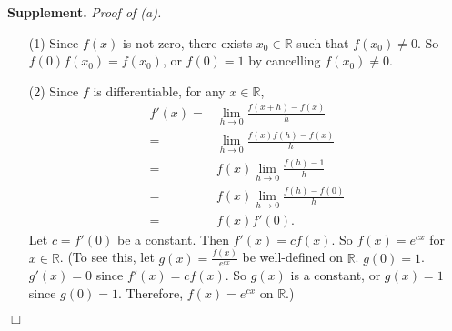 \documentclass{article}
\begin{document}
\textbf{Supplement.}
\emph{Proof of (a).}

\begin{enumerate}
\item[(1)]
Since $f(x)$ is not zero, there exists $x_0 \in \mathbb{R}$ such that $f(x_0) \neq 0$.
So $f(0)f(x_0) = f(x_0)$, or $f(0) = 1$ by cancelling $f(x_0) \neq 0$.
\item[(2)]
Since $f$ is differentiable, for any $x \in \mathbb{R}$,
\begin{align*}
f'(x)
=& \lim_{h \rightarrow 0} \frac{f(x + h) - f(x)}{h} \\
=& \lim_{h \rightarrow 0} \frac{f(x)f(h) - f(x)}{h} \\
=& f(x) \lim_{h \rightarrow 0} \frac{f(h) - 1}{h} \\
=& f(x) \lim_{h \rightarrow 0} \frac{f(h) - f(0)}{h} \\
=& f(x) f'(0).
\end{align*}
Let $c = f'(0)$ be a constant. Then $f'(x) = c f(x)$.
So $f(x) = e^{cx}$ for $x \in \mathbb{R}$.
(To see this, let $g(x) = \frac{f(x)}{e^{cx}}$ be well-defined on $\mathbb{R}$. $g(0) = 1$.
$g'(x) = 0$ since $f'(x) = c f(x)$. So $g(x)$ is a constant, or $g(x) = 1$ since $g(0) = 1$.
Therefore, $f(x) = e^{cx}$ on $\mathbb{R}$.)
\end{enumerate}
$\Box$ \\
\end{document}
